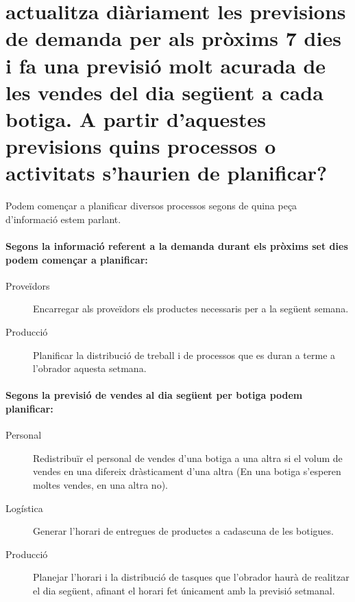 \section{\QnF actualitza diàriament les previsions de demanda per als pròxims 7 dies i fa una previsió molt acurada de les vendes del dia següent a cada botiga. A partir d’aquestes previsions quins processos o activitats s’haurien de planificar?}

Podem començar a planificar diversos processos segons de quina peça d'informació estem parlant.

\paragraph{Segons la informació referent a la demanda durant els pròxims set dies podem començar a planificar:}

\begin{description}
  \item[Proveïdors] Encarregar als proveïdors els productes necessaris per a la següent semana.
  \item[Producció] Planificar la distribució de treball i de processos que es duran a terme a l'obrador aquesta setmana.
\end{description}

\paragraph{Segons la previsió de vendes al dia següent per botiga podem planificar:}

\begin{description}
  \item[Personal] Redistribuïr el personal de vendes d'una botiga a una altra si el volum de vendes en una difereix dràsticament d'una altra (En una botiga s'esperen moltes vendes, en una altra no).
  \item[Logística] Generar l'horari de entregues de productes a cadascuna de les botigues.
  \item[Producció] Planejar l'horari i la distribució de tasques que l'obrador haurà de realitzar el dia següent, afinant el horari fet únicament amb la previsió setmanal.
\end{description}
